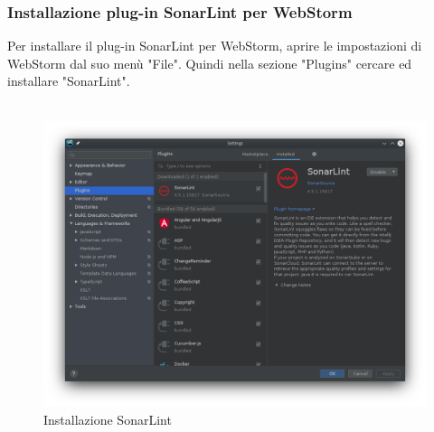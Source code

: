 \subsubsection{Installazione plug-in SonarLint per WebStorm}
Per installare il plug-in SonarLint per WebStorm, aprire le impostazioni di WebStorm dal suo menù "File". Quindi nella sezione "Plugins" cercare ed installare "SonarLint".
\\
\\
\begin{figure}[H] 	
	\begin{center}
		\includegraphics[width=\textwidth,height=\textheight,keepaspectratio]{img/sonarlint.png}
	\end{center}
	\caption{Installazione SonarLint}	
\end{figure}

